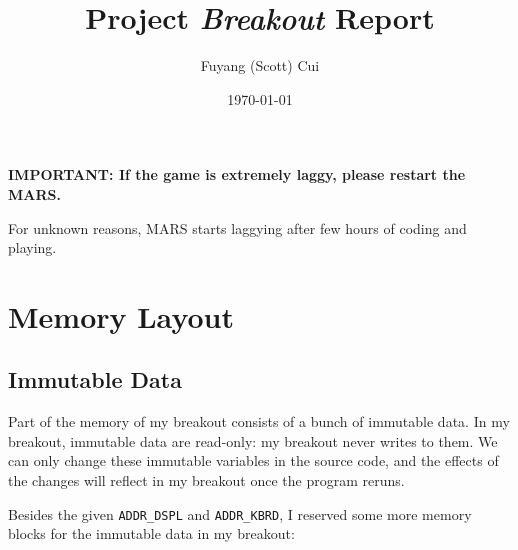 \documentclass{article}
\title{Project \textit{Breakout} Report}
\author{Fuyang (Scott) Cui}
\date{\today}
\newcommand{\code}[1]{\texttt{#1}}
\begin{document}
\maketitle 
\tableofcontents
\newpage

\textbf{IMPORTANT: If the game is extremely laggy, please restart the MARS.}

For unknown reasons, MARS starts laggying after few hours of coding and playing.

\section{Memory Layout}

\subsection{Immutable Data}

Part of the memory of my breakout consists of a bunch of immutable data. In my breakout, immutable data are read-only: my breakout never writes to them. We can only change these immutable variables in the source code, and the effects of the changes will reflect in my breakout once the program reruns.

Besides the given \code{ADDR\_DSPL} and \code{ADDR\_KBRD}, I reserved some more memory blocks for the immutable data in my breakout:
\end{document}

